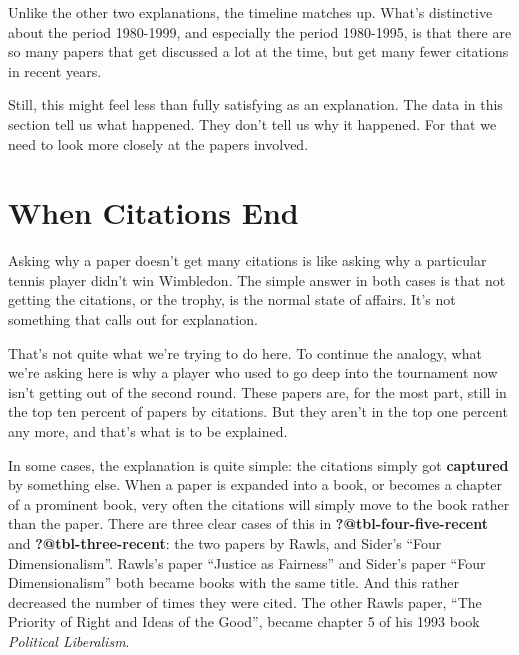 \documentclass[
  10pt,
  letterpaper,
  DIV=11,
  numbers=noendperiod,
  twoside]{scrartcl}
\begin{document}
Unlike the other two explanations, the timeline matches up. What's
distinctive about the period 1980-1999, and especially the period
1980-1995, is that there are so many papers that get discussed a lot at
the time, but get many fewer citations in recent years.

Still, this might feel less than fully satisfying as an explanation. The
data in this section tell us what happened. They don't tell us why it
happened. For that we need to look more closely at the papers involved.

\section{When Citations End}\label{sec-when-citations-end}

Asking why a paper doesn't get many citations is like asking why a
particular tennis player didn't win Wimbledon. The simple answer in both
cases is that not getting the citations, or the trophy, is the normal
state of affairs. It's not something that calls out for explanation.

That's not quite what we're trying to do here. To continue the analogy,
what we're asking here is why a player who used to go deep into the
tournament now isn't getting out of the second round. These papers are,
for the most part, still in the top ten percent of papers by citations.
But they aren't in the top one percent any more, and that's what is to
be explained.

In some cases, the explanation is quite simple: the citations simply got
\textbf{captured} by something else. When a paper is expanded into a
book, or becomes a chapter of a prominent book, very often the citations
will simply move to the book rather than the paper. There are three
clear cases of this in \textbf{?@tbl-four-five-recent} and
\textbf{?@tbl-three-recent}: the two papers by Rawls, and Sider's ``Four
Dimensionalism''. Rawls's paper ``Justice as Fairness'' and Sider's
paper ``Four Dimensionalism'' both became books with the same title. And
this rather decreased the number of times they were cited. The other
Rawls paper, ``The Priority of Right and Ideas of the Good'', became
chapter 5 of his 1993 book \emph{Political Liberalism}.
\end{document}
